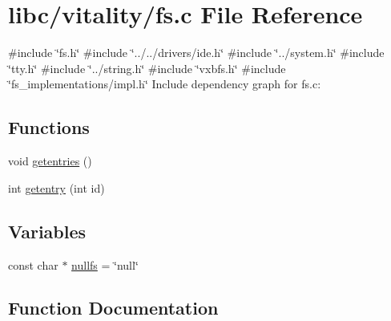 \hypertarget{a00143}{}\section{libc/vitality/fs.c File Reference}
\label{a00143}
{\ttfamily \#include \char`\"{}fs.\+h\char`\"{}}\newline
{\ttfamily \#include \char`\"{}../../drivers/ide.\+h\char`\"{}}\newline
{\ttfamily \#include \char`\"{}../system.\+h\char`\"{}}\newline
{\ttfamily \#include \char`\"{}tty.\+h\char`\"{}}\newline
{\ttfamily \#include \char`\"{}../string.\+h\char`\"{}}\newline
{\ttfamily \#include \char`\"{}vxbfs.\+h\char`\"{}}\newline
{\ttfamily \#include \char`\"{}fs\+\_\+implementations/impl.\+h\char`\"{}}\newline
Include dependency graph for fs.\+c\+:
\subsection*{Functions}
\begin{DoxyCompactItemize}
\item 
void \hyperlink{a00143_a414110036132977c34813673360e1a63_a414110036132977c34813673360e1a63}{getentries} ()
\item 
int \hyperlink{a00143_a3fb32d07d3bd05144a196c94fc59c0d1_a3fb32d07d3bd05144a196c94fc59c0d1}{getentry} (int id)
\end{DoxyCompactItemize}
\subsection*{Variables}
\begin{DoxyCompactItemize}
\item 
const char $\ast$ \hyperlink{a00143_a36265ac74fd925405e1179e799961f1e_a36265ac74fd925405e1179e799961f1e}{nullfs} = \char`\"{}null\char`\"{}
\end{DoxyCompactItemize}


\subsection{Function Documentation}
\mbox{\label{a00143_a414110036132977c34813673360e1a63_a414110036132977c34813673360e1a63}} 
